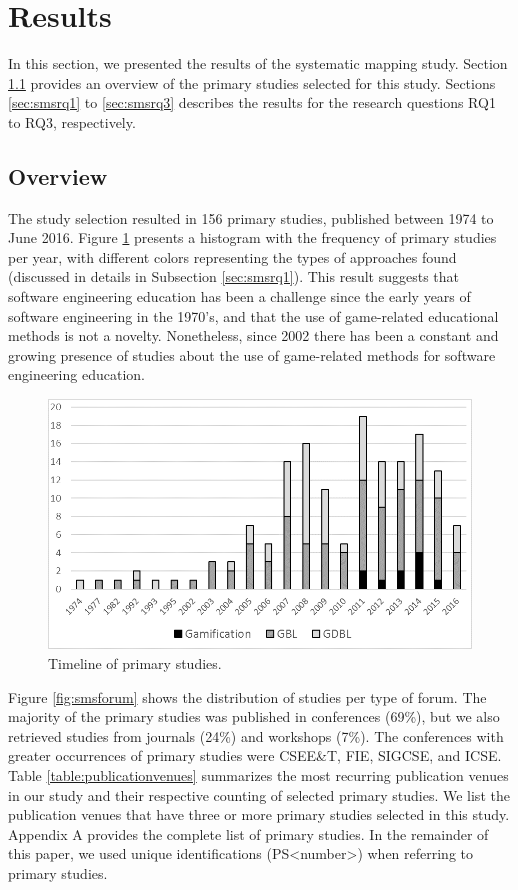 \section{Results}
\label{sec:smsresults}

In this section, we presented the results of the systematic mapping study. Section \ref{sec:smsresultoverview} provides an overview of the primary studies selected for this study. Sections \ref{sec:smsrq1} to \ref{sec:smsrq3} describes the results for the research questions RQ1 to RQ3, respectively.

\subsection{Overview}
\label{sec:smsresultoverview}

The study selection resulted in 156 primary studies, published between 1974 to June 2016. Figure \ref{fig:smstimeline} presents a histogram with the frequency of primary studies per year, with different colors representing the types of approaches found (discussed in details in Subsection \ref{sec:smsrq1}). This result suggests that software engineering education has been a challenge since the early years of software engineering in the 1970’s, and that the use of game-related educational methods is not a novelty. Nonetheless, since 2002 there has been a constant and growing presence of studies about the use of game-related methods for software engineering education.

\begin{figure}[!h]%
\centering
\includegraphics{img/smsTimeline.png}
\caption{Timeline of primary studies.}
\label{fig:smstimeline}
\end{figure} 

Figure \ref{fig:smsforum} shows the distribution of studies per type of forum. The majority of the primary studies was published in conferences (69\%), but we also retrieved studies from journals (24\%) and workshops (7\%). The conferences with greater occurrences of primary studies were CSEE&T, FIE, SIGCSE, and ICSE. Table \ref{table:publicationvenues} summarizes the most recurring publication venues in our study and their respective counting of selected primary studies. We list the publication venues that have three or more primary studies selected in this study. Appendix A provides the complete list of primary studies. In the remainder of this paper, we used unique identifications (PS<number>) when referring to primary studies.

